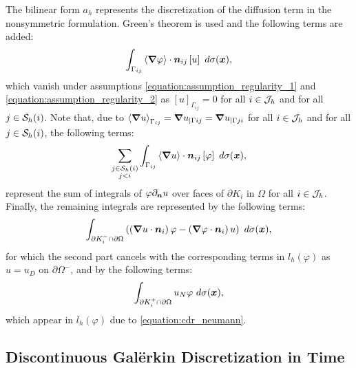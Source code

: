 The bilinear form $a_h$ represents the discretization of the diffusion term in the nonsymmetric formulation. Green's theorem is used and the following terms are added:
\begin{gather}
    \int_{\Gamma_{ij}} \left\langle \bm{\nabla} \varphi \right\rangle \cdot \bm{n}_{ij} \left[ u \right] ~ d \sigma(\bm{x}),
\end{gather}
which vanish under assumptions \eqref{equation:assumption_regularity_1} and \eqref{equation:assumption_regularity_2} as $\left[ u \right]_{\Gamma_{ij}} = 0$ for all $i \in \mathcal{J}_h$ and for all $j \in \mathcal{S}_h(i)$. Note that, due to $\left\langle \bm{\nabla} u \right\rangle_{\Gamma_{ij}} = \bm{\nabla} u_{\mid \Gamma{ij}} = \bm{\nabla} u_{\mid \Gamma{ji}}$ for all $i \in \mathcal{J}_h$ and for all $j \in \mathcal{S}_h(i)$, the following terms:
\begin{gather}
    \sum_{\substack{j \in \mathcal{S}_h(i) \\ j < i}} \int_{\Gamma_{ij}} \left\langle \bm{\nabla} u \right\rangle \cdot \bm{n}_{ij} \left[ \varphi \right] ~ d \sigma(\bm{x}),
\end{gather}
represent the sum of integrals of $\varphi \partial_{\bm{n}} u$ over faces of $\partial K_i$ in $\Omega$ for all $i \in \mathcal{J}_h$. Finally, the remaining integrals are represented by the following terms:
\begin{gather}
    \int_{\partial K_i^- \cap \partial \Omega} \left( \left( \bm{\nabla} u \cdot \bm{n}_i \right) \varphi - \left( \bm{\nabla} \varphi \cdot \bm{n}_i \right) u \right) ~ d \sigma(\bm{x}),
\end{gather}
for which the second part cancels with the corresponding terms in $l_h(\varphi)$ as $u = u_D$ on $\partial \Omega^-$, and by the following terms:
\begin{gather}
    \int_{\partial K_i^+ \cap \partial \Omega} u_N \varphi ~ d \sigma(\bm{x}),
\end{gather}
which appear in $l_h(\varphi)$ due to \eqref{equation:cdr_neumann}.

\newpage
\subsection{Discontinuous Galërkin Discretization in Time}